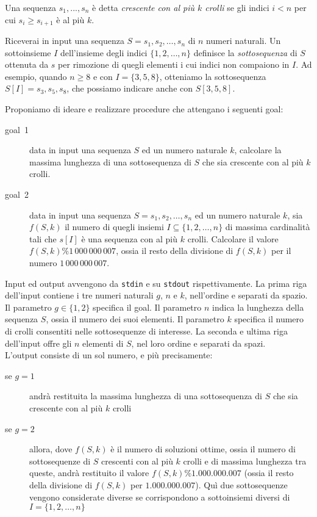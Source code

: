 \renewcommand{\nomebreve}{incr\_subseq\_with\_drops}
\renewcommand{\titolo}{Massima sottosequenza crescente con crolli}

\introduzione{}

\noindent
Una sequenza $s_1, ..., s_n$ è detta \emph{crescente con al più $k$ crolli} se gli indici $i<n$ per cui $s_i\geq s_{i+1}$ è al più $k$.

Riceverai in input una sequenza $S=s_1,s_2, \ldots, s_n$ di $n$ numeri naturali. Un sottoinsieme $I$ dell'insieme degli indici $\{1,2, \ldots, n\}$ definisce la \emph{sottosequenza} di $S$ ottenuta da $s$ per rimozione di quegli elementi i cui indici non compaiono in $I$.
Ad esempio, quando $n\geq 8$ e con $I=\{3,5,8\}$, otteniamo la sottosequenza $S[I]=s_3,s_5,s_8$, che possiamo indicare anche con $S[3,5,8]$.

Proponiamo di ideare e realizzare procedure che attengano i seguenti goal:

\begin{description}
  \item[goal~1] data in input una sequenza $S$ ed un numero naturale $k$, calcolare la massima lunghezza di una sottosequenza di $S$ che sia crescente con al più $k$ crolli.
  
  \item[goal~2] data in input una sequenza $S=s_1,s_2, \ldots, s_n$ ed un numero naturale $k$, sia $f(S,k)$ il numero di quegli insiemi $I\subseteq \{1,2, \ldots, n\}$ di massima cardinalità tali che $s[I]$ è una sequenza con al più $k$ crolli. Calcolare il valore $f(S,k) \% 1\,000\,000\,007$, ossia il resto della divisione di $f(S,k)$ per il numero $1\,000\,000\,007$.
\end{description}


Input ed output avvengono da \verb'stdin' e su \verb'stdout' rispettivamente.
La prima riga dell'input contiene i tre numeri naturali $g$, $n$ e $k$, nell'ordine e separati da spazio. Il parametro $g\in \{1,2\}$ specifica il goal. Il parametro $n$ indica la lunghezza della sequenza $S$, ossia il numero dei suoi elementi. Il parametro $k$ specifica il numero di crolli consentiti nelle sottosequenze di interesse.
La seconda e ultima riga dell'input offre gli $n$ elementi di $S$, nel loro ordine e separati da spazi.\\

L'output consiste di un sol numero, e più precisamente:
\begin{description}
  \item[se $g=1$] andrà restituita la massima lunghezza di una sottosequenza di $S$ che sia crescente con al più $k$ crolli
  \item[se $g=2$] allora, dove $f(S,k)$ è il numero di soluzioni ottime, ossia il numero di sottosequenze di $S$ crescenti con al più $k$ crolli e di massima lunghezza tra queste, andrà restituito il valore $f(S,k)\%1.000.000.007$ (ossia il resto della divisione di $f(S,k)$ per $1.000.000.007$). Quì due sottosequenze vengono considerate diverse se corrispondono a sottoinsiemi diversi di $I=\{1,2, \ldots, n\}$   
\end{description}

